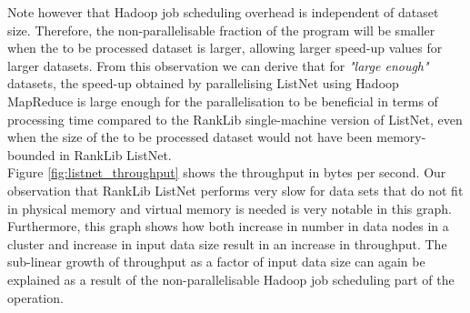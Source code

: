 Note however that Hadoop job scheduling overhead is independent of dataset size. Therefore, the non-parallelisable fraction of the program will be smaller when the to be processed dataset is larger, allowing larger speed-up values for larger datasets. From this observation we can derive that for \emph{"large enough"} datasets, the speed-up obtained by parallelising ListNet using Hadoop MapReduce is large enough for the parallelisation to be beneficial in terms of processing time compared to the RankLib single-machine version of ListNet, even when the size of the to be processed dataset would not have been memory-bounded in RankLib ListNet.\\

Figure \ref{fig:listnet_throughput} shows the throughput in bytes per second. Our observation that RankLib ListNet performs very slow for data sets that do not fit in physical memory and virtual memory is needed is very notable in this graph. Furthermore, this graph shows how both increase in number in data nodes in a cluster and increase in input data size result in an increase in throughput. The sub-linear growth of throughput as a factor of input data size can again be explained as a result of the non-parallelisable Hadoop job scheduling part of the operation.\\

